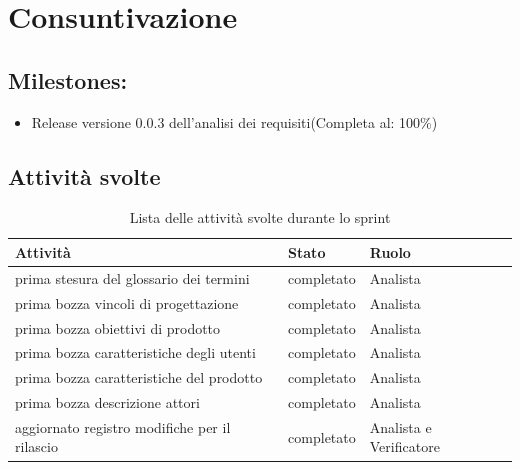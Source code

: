 \section{Consuntivazione}

\subsection{Milestones:}
\begin{itemize}
    \item Release versione 0.0.3 dell'analisi dei requisiti(Completa al: 100\%)
\end{itemize}

\subsection{Attività svolte}


\begin{table}[ht]
    \begin{tabularx}{\textwidth}{X l l}
        
        \rowcolor{gray!30} \textbf{Attività} & \textbf{Stato} & \textbf{Ruolo}\\
        
        \hline
        prima stesura del glossario dei termini & completato & Analista\\
        prima bozza vincoli di progettazione & completato & Analista\\
        prima bozza obiettivi di prodotto & completato & Analista\\
        prima bozza caratteristiche degli utenti & completato & Analista\\
        prima bozza caratteristiche del prodotto & completato & Analista\\
        prima bozza descrizione attori & completato & Analista\\
        aggiornato registro modifiche per il rilascio & completato & Analista e Verificatore\\
    \end{tabularx}
    \caption{Lista delle attività svolte durante lo sprint}
\end{table}


